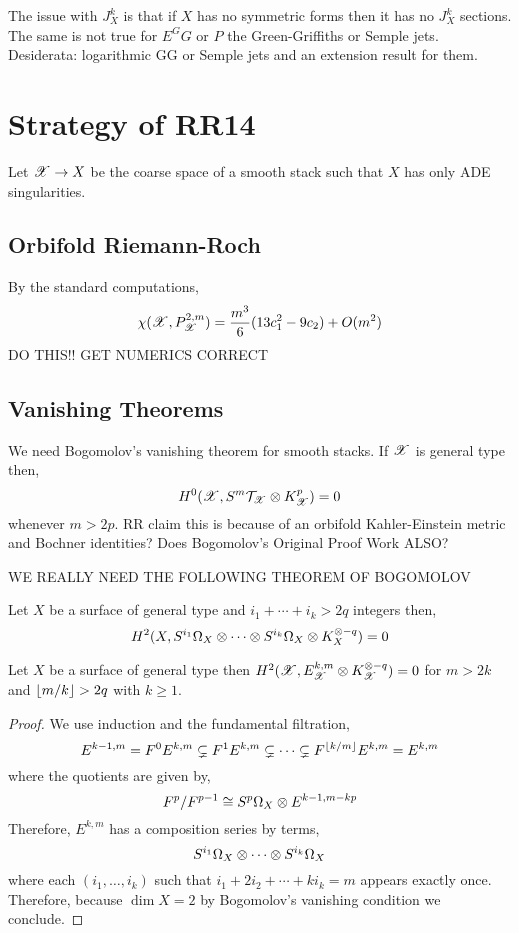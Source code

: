 \documentclass[12pt]{article}
\begin{document}
The issue with $J^k_X$ is that if $X$ has no symmetric forms then it has no $J^k_X$ sections. The same is not true for $E^GG$ or $P$ the Green-Griffiths or Semple jets.
\bigskip\\
Desiderata: logarithmic GG or Semple jets and an extension result for them. 

\section{Strategy of RR14}

Let $\mathscr{X} \to X$ be the coarse space of a smooth stack such that $X$ has only ADE singularities. 

\subsection{Orbifold Riemann-Roch}

By the standard computations,
\[ \chi(\mathscr{X}, P^{2,m}_{\mathscr{X}}) = \frac{m^3}{6} (13 c_1^2 -  9 c_2) + O(m^2) \]
{\color{red} DO THIS!! GET NUMERICS CORRECT}

\subsection{Vanishing Theorems}

We need Bogomolov's vanishing theorem for smooth stacks. If $\mathscr{X}$ is general type then,
\[ H^0(\mathscr{X}, S^m \mathcal{T}_{\mathscr{X}} \otimes K_{\mathscr{X}}^p) = 0 \]
whenever $m > 2 p$. {\color{red} RR claim this is because of an orbifold Kahler-Einstein metric and Bochner identities? Does Bogomolov's Original Proof Work ALSO?}

{\color{red} WE REALLY NEED THE FOLLOWING THEOREM OF BOGOMOLOV}

\begin{theorem}[Bogomolov]
Let $X$ be a surface of general type and $i_1 + \cdots + i_k > 2q$ integers then,
\[ H^2(X, S^{i_1} \Omega_X \otimes \cdots \otimes S^{i_k} \Omega_X \otimes K_X^{\otimes -q}) = 0 \]
\end{theorem}

\begin{prop}
Let $X$ be a surface of general type then $H^2(\mathscr{X}, E^{k,m}_{\mathscr{X}} \otimes K_{\mathscr{X}}^{\otimes -q}) = 0$ for $m > 2k$ and $\left\lfloor m/k \right\rfloor > 2 q$ with $k \ge 1$.
\end{prop}


\begin{proof}
We use induction and the fundamental filtration,
\[ E^{k-1,m} = F^0 E^{k,m} \subsetneq F^1 E^{k,m} \subsetneq \cdots \subsetneq F^{\left\lfloor k/m \right\rfloor} E^{k,m} = E^{k,m} \]  
where the quotients are given by,
\[ F^p / F^{p-1} \cong S^p \Omega_X \otimes E^{k-1, m-kp} \]
Therefore, $E^{k,m}$ has a composition series by terms,
\[ S^{i_1} \Omega_X \otimes \cdots \otimes S^{i_k} \Omega_X \]
where each $(i_1, \dots, i_k)$ such that $i_1 + 2 i_2 + \cdots + k i_k = m$ appears exactly once. Therefore, because $\dim{X} = 2$ by Bogomolov's vanishing condition we conclude. 
\end{proof}
\end{document}
